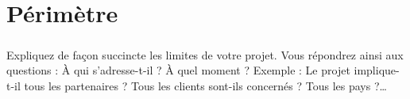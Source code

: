 \chapter{Périmètre}
\paragraph{}
Expliquez de façon succincte les limites de votre projet. Vous répondrez ainsi aux questions : À qui s’adresse-t-il ? À quel moment ? Exemple : Le projet implique-t-il tous les partenaires ? Tous les clients sont-ils concernés ? Tous les pays ?…